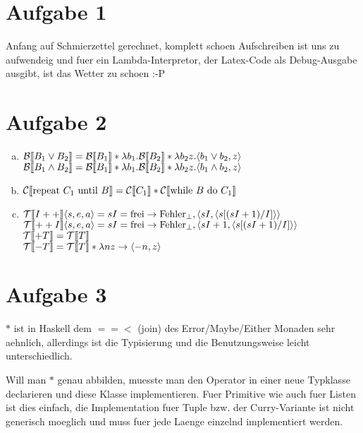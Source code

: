 




\newcommand{\nr}{10}



\section*{Aufgabe 1}
Anfang auf Schmierzettel gerechnet, komplett schoen Aufschreiben ist uns zu aufwendeig 
und fuer ein Lambda-Interpretor, der Latex-Code als Debug-Ausgabe ausgibt, ist das Wetter zu schoen :-P

\section*{Aufgabe 2}
\begin{enumerate}[a)]
\item ${\mathcal{B}\llbracket B_1 \lor B_2\rrbracket} = {\mathcal{B}\llbracket B_1\rrbracket} * \lambda b_1 . {\mathcal{B}\llbracket B_2\rrbracket} * \lambda b_2 z . \langle b_1 \lor b_2 , z \rangle$
   \\ ${\mathcal{B}\llbracket B_1 \land B_2\rrbracket} = {\mathcal{B}\llbracket B_1\rrbracket} * \lambda b_1 . {\mathcal{B}\llbracket B_2\rrbracket} * \lambda b_2 z . \langle b_1 \land b_2 , z \rangle$
\item ${\mathcal{C}\llbracket\text{repeat } C_1 \text{ until } B\rrbracket} = {\mathcal{C}\llbracket C_1\rrbracket} * {\mathcal{C}\llbracket\text{while } B \text{ do } C_1\rrbracket}$
\item ${\mathcal{T}\llbracket I++\rrbracket} \langle s, e, a \rangle = s I = \text{frei} \to \text{Fehler}_{\bot}, \langle s I,\langle s[(s I + 1)/I]\rangle\rangle$
   \\ ${\mathcal{T}\llbracket++I\rrbracket} \langle s, e, a \rangle = s I = \text{frei} \to \text{Fehler}_{\bot}, \langle s I + 1,\langle s[(s I + 1)/I]\rangle\rangle$
   \\ ${\mathcal{T}\llbracket+T\rrbracket} = {\mathcal{T}\llbracket T\rrbracket}$
   \\ ${\mathcal{T}\llbracket-T\rrbracket} = {\mathcal{T}\llbracket T\rrbracket} * \lambda n z \to \langle -n, z \rangle$
\end{enumerate}


\section*{Aufgabe 3}
$*$ ist in Haskell dem $==<$ (join) des Error/Maybe/Either Monaden sehr
aehnlich, allerdings ist die Typisierung und die Benutzungsweise leicht
unterschiedlich.

Will man $*$ genau abbilden, muesste man den Operator in einer neue
Typklasse declarieren und diese Klasse implementieren. 
Fuer Primitive wie auch fuer Listen ist dies einfach, 
die Implementation fuer Tuple bzw. der Curry-Variante ist nicht
generisch moeglich und muss fuer jede Laenge einzelnd implementiert werden.


